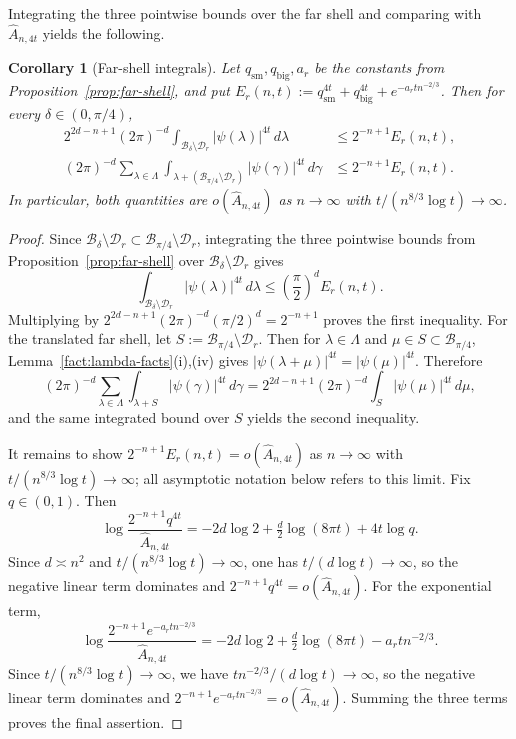 \documentclass[11pt]{article}
\newtheorem{corollary}[theorem]{Corollary}
\theoremstyle{definition}
\newcommand{\Bbox}{\mathcal{B}}
\newcommand{\Dd}{\mathcal{D}}
\newcommand{\Ahat}{\hat A_{n,4t}}
\begin{document}
Integrating the three pointwise bounds over the far shell and comparing with \(\Ahat\) yields the following.

\begin{corollary}[Far-shell integrals]\label{cor:far-negligible}
Let \(q_{\mathrm{sm}},q_{\mathrm{big}},a_r\) be the constants from
Proposition~\ref{prop:far-shell}, and put
\(E_r(n,t):=q_{\mathrm{sm}}^{4t}+q_{\mathrm{big}}^{4t}+e^{-a_r t n^{-2/3}}\).
Then for every \(\delta\in(0,\pi/4)\),
\[
  \begin{aligned}
  2^{2d-n+1}(2\pi)^{-d}\int_{\Bbox_\delta\setminus\Dd_r}|\psi(\lambda)|^{4t}\,d\lambda
    &\le 2^{-n+1}E_r(n,t),\\[3pt]
  (2\pi)^{-d}\sum_{\lambda\in\Lambda}
    \int_{\lambda+(\Bbox_{\pi/4}\setminus\Dd_r)}|\psi(\gamma)|^{4t}\,d\gamma
    &\le 2^{-n+1}E_r(n,t).
  \end{aligned}
\]
In particular, both quantities are \(o(\Ahat)\) as \(n\to\infty\) with \(t/(n^{8/3}\log t)\to\infty\).
\end{corollary}

\begin{proof}
Since \(\Bbox_\delta\setminus\Dd_r\subset \Bbox_{\pi/4}\setminus\Dd_r\), integrating
the three pointwise bounds from Proposition~\ref{prop:far-shell} over
\(\Bbox_\delta\setminus\Dd_r\) gives
\[
  \int_{\Bbox_\delta\setminus\Dd_r}|\psi(\lambda)|^{4t}\,d\lambda
  \le
  \left(\frac{\pi}{2}\right)^d E_r(n,t).
\]
Multiplying by \(2^{2d-n+1}(2\pi)^{-d}(\pi/2)^d=2^{-n+1}\)
proves the first inequality.
For the translated far shell, let \(S:=\Bbox_{\pi/4}\setminus\Dd_r\). Then for
\(\lambda\in\Lambda\) and \(\mu\in S\subset\Bbox_{\pi/4}\), Lemma~\ref{fact:lambda-facts}(i),(iv) gives
\(|\psi(\lambda+\mu)|^{4t}=|\psi(\mu)|^{4t}\). Therefore
\[
  (2\pi)^{-d}\sum_{\lambda\in\Lambda}\int_{\lambda+S}|\psi(\gamma)|^{4t}\,d\gamma
  =2^{2d-n+1}(2\pi)^{-d}\int_S|\psi(\mu)|^{4t}\,d\mu,
\]
and the same integrated bound over \(S\) yields the second inequality.

It remains to show \(2^{-n+1}E_r(n,t)=o(\Ahat)\) as \(n\to\infty\) with \(t/(n^{8/3}\log t)\to\infty\); all asymptotic notation below refers to this limit. Fix \(q\in(0,1)\). Then
\[
  \log\frac{2^{-n+1}q^{4t}}{\Ahat}
  =-2d\log2+\tfrac d2\log(8\pi t)+4t\log q.
\]
Since \(d\asymp n^2\) and \(t/(n^{8/3}\log t)\to\infty\), one has \(t/(d\log t)\to\infty\), so the
negative linear term dominates and \(2^{-n+1}q^{4t}=o(\Ahat)\). For the exponential term,
\[
  \log\frac{2^{-n+1}e^{-a_r t n^{-2/3}}}{\Ahat}
  =-2d\log2+\tfrac d2\log(8\pi t)-a_r t n^{-2/3}.
\]
Since \(t/(n^{8/3}\log t)\to\infty\), we have \(tn^{-2/3}/(d\log t)\to\infty\), so the negative linear term dominates and \(2^{-n+1}e^{-a_r t n^{-2/3}}=o(\Ahat)\). Summing the three terms proves the final assertion.
\end{proof}
\end{document}
